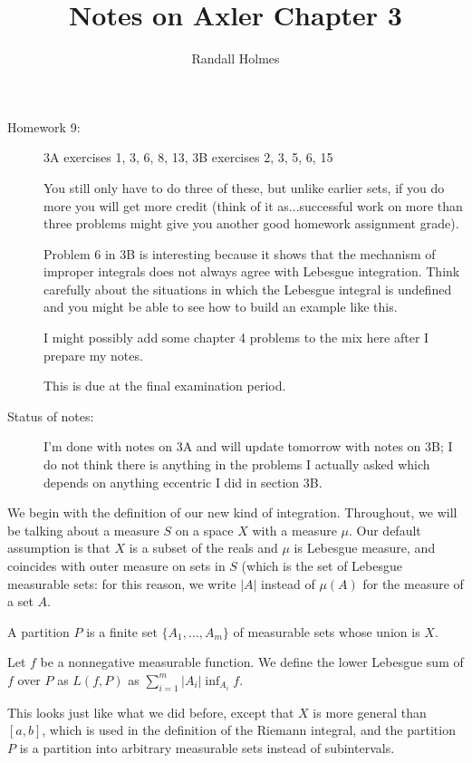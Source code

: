 \documentclass[12pt]{article}
\title{Notes on Axler Chapter 3}
\author{Randall Holmes}
\begin{document}
\maketitle

\begin{description}

\item[Homework 9:]  3A exercises 1, 3, 6, 8, 13, 3B exercises 2, 3, 5, 6, 15

You still only have to do three of these, but unlike earlier sets, if you do more you will get more credit (think of it as...successful work on more than three problems might give you another good homework assignment grade).

Problem 6 in 3B is interesting because it shows that the mechanism of improper integrals does not always agree with Lebesgue integration.  Think carefully about the situations in which the Lebesgue integral is undefined and you might be able to see how to build an example like this.

I might possibly add some chapter 4 problems to the mix here after I prepare my notes.

This is due at the final examination period.

\item[Status of notes:]  I'm done with notes on 3A and will update tomorrow with notes on 3B;  I do not think there is anything in the problems I actually asked which depends on anything eccentric I did in section 3B.

\end{description}

We begin with the definition of our new kind of integration.  Throughout, we will be talking about a measure $S$ on a space $X$ with a measure $\mu$.  Our default assumption is that $X$ is a subset of the reals and $\mu$ is Lebesgue measure, and coincides with outer measure on sets in $S$ (which is the set of Lebesgue measurable sets:  for this reason, we write $|A|$ instead of $\mu(A)$ for the measure of a set $A$.

A partition $P$  is a finite set $\{A_1,\ldots,A_m\}$ of measurable sets whose union is $X$.

Let $f$ be a nonnegative measurable function.  We define the lower Lebesgue sum of $f$ over $P$ as $L(f,P)$ as $\sum_{i=1}^m |A_i|\inf_{A_i}f$.

This looks just like what we did before, except that $X$ is more general than $[a,b]$, which is used in the definition of the Riemann integral, and
the partition $P$ is a partition into arbitrary measurable sets instead of subintervals.
\end{document}
